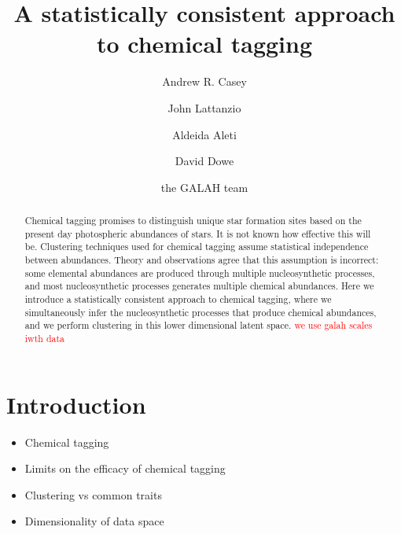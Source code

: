 \documentclass[twocolumn]{aastex61}
\newcommand{\todo}[1]{\textcolor{red}{#1}}
\begin{document}
\title{A statistically consistent approach to chemical tagging}


\author[0000-0003-0174-0564]{Andrew R. Casey}
			 
\author{John Lattanzio}

\author{Aldeida Aleti}

\author{David Dowe}

\author{the GALAH team}


\begin{abstract}
Chemical tagging promises to distinguish unique star formation sites based on the
present day photospheric abundances of stars.  It is not known how effective this
will be.  Clustering techniques used for chemical tagging  assume statistical 
independence between abundances. Theory and observations agree that this assumption
is incorrect: some elemental abundances are produced through multiple nucleosynthetic
processes, and most nucleosynthetic processes generates multiple chemical abundances.
Here we introduce a statistically consistent approach to chemical tagging, where we
simultaneously infer the nucleosynthetic processes that produce chemical abundances,
and we perform clustering in this lower dimensional latent space. \todo{we use galah}
\todo{scales iwth data}
\end{abstract}



\section{Introduction} \label{sec:intro}

\begin{itemize}
	\item Chemical tagging
	\item Limits on the efficacy of chemical tagging
	\item Clustering vs common traits
	\item Dimensionality of data space
\end{itemize}
\end{document}
